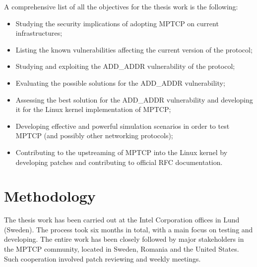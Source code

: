 A comprehensive list of all the objectives for the thesis work is the following:
\begin{itemize}
    \item Studying the security implications of adopting MPTCP on current infrastructures; 
    \item Listing the known vulnerabilities affecting the current version of the protocol; 
    \item Studying and exploiting the ADD\_ADDR vulnerability of the protocol;
    \item Evaluating the possible solutions for the ADD\_ADDR vulnerability; 
    \item Assessing the best solution for the ADD\_ADDR vulnerability and developing it for the Linux kernel implementation of MPTCP;
    \item Developing effective and powerful simulation scenarios in order to test MPTCP (and possibly other networking protocols);
    \item Contributing to the upstreaming of MPTCP into the Linux kernel by developing patches and contributing to official RFC documentation.
\end{itemize}

\section{Methodology}
The thesis work has been carried out at the Intel Corporation offices in Lund (Sweden). The process took six months in total, with a main focus on testing and developing. The entire work has been closely followed by major stakeholders in the MPTCP community, located in Sweden, Romania and the United States. Such cooperation involved patch reviewing and weekly meetings.


